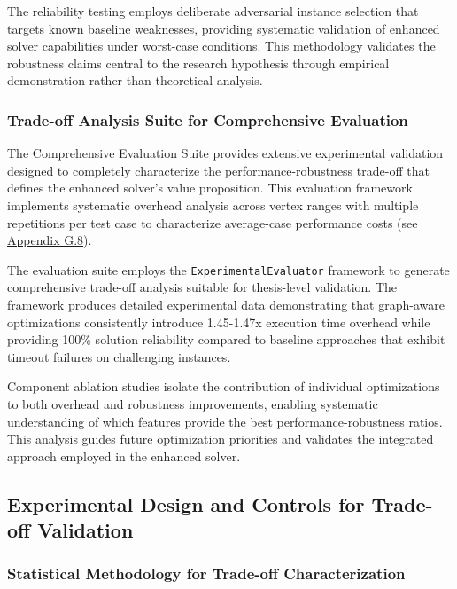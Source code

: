 The reliability testing employs deliberate adversarial instance selection that targets known baseline weaknesses, providing systematic validation of enhanced solver capabilities under worst-case conditions. This methodology validates the robustness claims central to the research hypothesis through empirical demonstration rather than theoretical analysis.

\subsubsection{Trade-off Analysis Suite for Comprehensive Evaluation}
\label{sec:comprehensive-evaluation-suite}

The Comprehensive Evaluation Suite provides extensive experimental validation designed to completely characterize the performance-robustness trade-off that defines the enhanced solver's value proposition. This evaluation framework implements systematic overhead analysis across vertex ranges with multiple repetitions per test case to characterize average-case performance costs (see \hyperref[appendix:comprehensive-evaluation]{Appendix G.8}).

The evaluation suite employs the \texttt{ExperimentalEvaluator} framework to generate comprehensive trade-off analysis suitable for thesis-level validation. The framework produces detailed experimental data demonstrating that graph-aware optimizations consistently introduce 1.45-1.47x execution time overhead while providing 100\% solution reliability compared to baseline approaches that exhibit timeout failures on challenging instances.

Component ablation studies isolate the contribution of individual optimizations to both overhead and robustness improvements, enabling systematic understanding of which features provide the best performance-robustness ratios. This analysis guides future optimization priorities and validates the integrated approach employed in the enhanced solver.

\subsection{Experimental Design and Controls for Trade-off Validation}
\label{sec:experimental-design}

\subsubsection{Statistical Methodology for Trade-off Characterization}
\label{sec:statistical-methodology}

